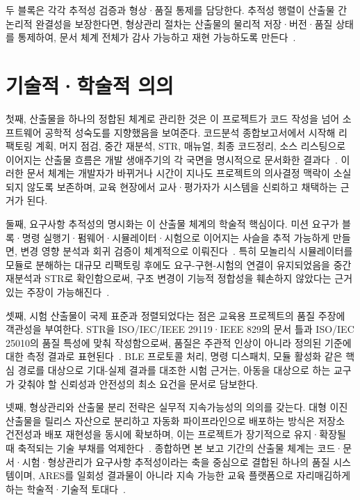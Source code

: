 두 블록은 각각 추적성 검증과 형상·품질 통제를 담당한다. 추적성 행렬이 산출물 간 논리적 완결성을 보장한다면, 형상관리 절차는 산출물의 물리적 저장·버전·품질 상태를 통제하여, 문서 체계 전체가 감사 가능하고 재현 가능하도록 만든다~\cite{chacon2014progit,ieee829}.

\section{기술적·학술적 의의}

첫째, 산출물을 하나의 정합된 체계로 관리한 것은 이 프로젝트가 코드 작성을 넘어 소프트웨어 공학적 성숙도를 지향했음을 보여준다. 코드분석 종합보고서에서 시작해 리팩토링 계획, 머지 점검, 중간 재분석, STR, 매뉴얼, 최종 코드정리, 소스 리스팅으로 이어지는 산출물 흐름은 개발 생애주기의 각 국면을 명시적으로 문서화한 결과다~\cite{mcconnell2004codecomplete,iso25010}. 이러한 문서 체계는 개발자가 바뀌거나 시간이 지나도 프로젝트의 의사결정 맥락이 소실되지 않도록 보존하며, 교육 현장에서 교사·평가자가 시스템을 신뢰하고 채택하는 근거가 된다.

둘째, 요구사항 추적성의 명시화는 이 산출물 체계의 학술적 핵심이다. 미션 요구가 블록·명령 실행기·펌웨어·시뮬레이터·시험으로 이어지는 사슬을 추적 가능하게 만들면, 변경 영향 분석과 회귀 검증이 체계적으로 이뤄진다~\cite{iso29119,fowler2018refactoring}. 특히 모놀리식 시뮬레이터를 모듈로 분해하는 대규모 리팩토링 후에도 요구-구현-시험의 연결이 유지되었음을 중간 재분석과 STR로 확인함으로써, 구조 변경이 기능적 정합성을 훼손하지 않았다는 근거 있는 주장이 가능해진다~\cite{feathers2004legacy}.

셋째, 시험 산출물이 국제 표준과 정렬되었다는 점은 교육용 프로젝트의 품질 주장에 객관성을 부여한다. STR을 ISO/IEC/IEEE 29119·IEEE 829의 문서 틀과 ISO/IEC 25010의 품질 특성에 맞춰 작성함으로써, 품질은 주관적 인상이 아니라 정의된 기준에 대한 측정 결과로 표현된다~\cite{iso29119,ieee829,iso25010}. BLE 프로토콜 처리, 명령 디스패치, 모듈 활성화 같은 핵심 경로를 대상으로 기대-실제 결과를 대조한 시험 근거는, 아동을 대상으로 하는 교구가 갖춰야 할 신뢰성과 안전성의 최소 요건을 문서로 담보한다.

넷째, 형상관리와 산출물 분리 전략은 실무적 지속가능성의 의의를 갖는다. 대형 이진 산출물을 릴리스 자산으로 분리하고 자동화 파이프라인으로 배포하는 방식은 저장소 건전성과 배포 재현성을 동시에 확보하며, 이는 프로젝트가 장기적으로 유지·확장될 때 축적되는 기술 부채를 억제한다~\cite{chacon2014progit,hunt1999pragmatic,ares-repo}. 종합하면 본 보고 기간의 산출물 체계는 코드·문서·시험·형상관리가 요구사항 추적성이라는 축을 중심으로 결합된 하나의 품질 시스템이며, ARES를 일회성 결과물이 아니라 지속 가능한 교육 플랫폼으로 자리매김하게 하는 학술적·기술적 토대다~\cite{iso25010,martin2008cleancode}.


